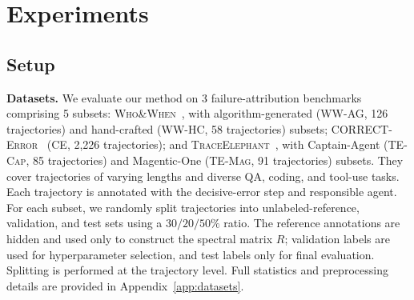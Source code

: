 \section{Experiments}
\label{sec:experiments}





\subsection{Setup}
\label{sec:exp:setup}



\textbf{Datasets.} We evaluate our method \soap on 3 failure-attribution benchmarks comprising 5 subsets:
\textsc{Who\&When}~\citep{whoandwhen}, with algorithm-generated
(\textsc{WW-AG}, 126 trajectories) and hand-crafted
(\textsc{WW-HC}, 58 trajectories) subsets;
\textsc{CORRECT-Error}~\citep{correct}
(\textsc{CE}, 2{,}226 trajectories);
and \textsc{TraceElephant}~\citep{traceelephant}, with Captain-Agent
(\textsc{TE-Cap}, 85 trajectories) and Magentic-One
(\textsc{TE-Mag}, 91 trajectories) subsets.
They cover trajectories of varying lengths and diverse QA, coding,
and tool-use tasks. Each trajectory is annotated with the decisive-error step
and responsible agent. For each subset, we randomly split trajectories into unlabeled-reference,
validation, and test sets using a $30/20/50\%$ ratio.
The reference annotations are hidden and used only to construct the spectral
matrix $R$; validation labels are used for hyperparameter selection, and test
labels only for final evaluation.
Splitting is performed at the trajectory level.
Full statistics and preprocessing details are provided in
Appendix~\ref{app:datasets}. 





